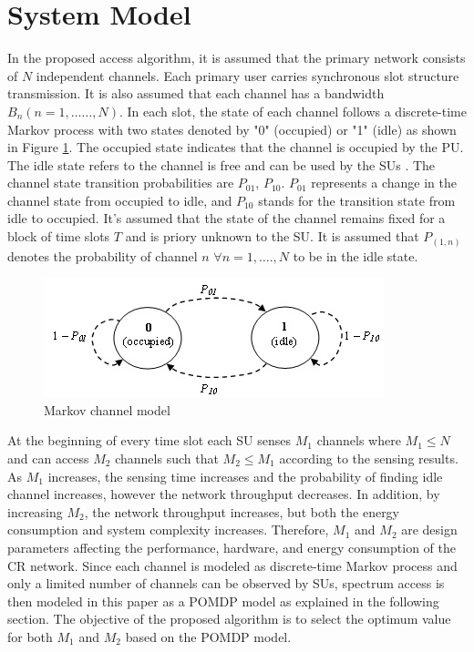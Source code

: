 \documentclass[twocolumn]{el-author}
\begin{document}
	
	
	
	\section{System Model}
	
	In the proposed access algorithm, it is assumed that the primary network consists of $N$ independent channels. Each primary user carries synchronous slot structure transmission. It is also assumed that each channel has a bandwidth $B_n (n=1,\dots \dots ,N)$.  In each slot, the state of each channel follows a discrete-time Markov process with two states denoted by "0" (occupied) or "1" (idle) as shown in Figure \ref{fig:pomdp}. The occupied state indicates that the channel is occupied by the PU. The idle state refers to the channel is free and can be used by the SUs \cite{Choi2011,Masrub2012,Zhao2007}. The channel state transition probabilities are $P_{01}$, $P_{10}$. $P_{01}$ represents a change in the channel state from occupied to idle, and $P_{10}$ stands for the transition state from idle to occupied. It's assumed that the state of the channel remains fixed for a block of time slots $T$ and is priory unknown to the SU. It is assumed that $P_{(1,n)}$ denotes the probability of channel $n$  $ \forall {n=1,\dots .,N}$ to be in the idle state.
	\begin{figure}[h]
				\centering
				\includegraphics[width=0.6\columnwidth]{./pomdp.jpg}
				\caption{Markov channel model}
				\label{fig:pomdp}
			\end{figure}
	At the beginning of every  time slot each SU senses $M_1$ channels where $M_1 \le N$ and can access $M_2$ channels such that $M_2\le M_1$ according to the sensing results. As $M_1$ increases, the sensing time increases and the probability of finding idle channel increases, however the network throughput decreases. In addition, by increasing $M_2$, the network throughput increases, but both the energy consumption and system complexity increases. Therefore, $M_1$ and $M_2$ are design parameters affecting the performance, hardware, and energy consumption of the CR network. Since each channel is modeled as discrete-time Markov process and only a limited number of channels can be observed by SUs, spectrum access is then modeled in this paper as a POMDP model as explained in the following section. The objective of the proposed algorithm is to select the optimum value for both $M_1$ and $M_2$ based on the POMDP model. 
	
\end{document}
